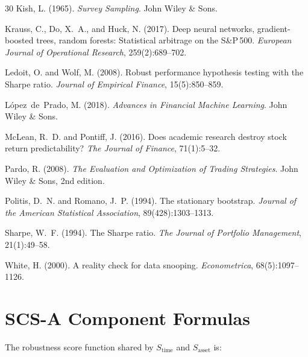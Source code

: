 \documentclass[12pt,a4paper]{article}
\begin{document}
\begin{thebibliography}{30}
Kish, L. (1965).
\newblock \emph{Survey Sampling}.
\newblock John Wiley \& Sons.

Krauss, C., Do, X.~A., and Huck, N. (2017).
\newblock Deep neural networks, gradient-boosted trees, random forests:
  Statistical arbitrage on the S\&P\,500.
\newblock \emph{European Journal of Operational Research}, 259(2):689--702.

Ledoit, O. and Wolf, M. (2008).
\newblock Robust performance hypothesis testing with the Sharpe ratio.
\newblock \emph{Journal of Empirical Finance}, 15(5):850--859.

L{\'o}pez~de~Prado, M. (2018).
\newblock \emph{Advances in Financial Machine Learning}.
\newblock John Wiley \& Sons.

McLean, R.~D. and Pontiff, J. (2016).
\newblock Does academic research destroy stock return predictability?
\newblock \emph{The Journal of Finance}, 71(1):5--32.

Pardo, R. (2008).
\newblock \emph{The Evaluation and Optimization of Trading Strategies}.
\newblock John Wiley \& Sons, 2nd edition.

Politis, D.~N. and Romano, J.~P. (1994).
\newblock The stationary bootstrap.
\newblock \emph{Journal of the American Statistical Association}, 89(428):1303--1313.

Sharpe, W.~F. (1994).
\newblock The Sharpe ratio.
\newblock \emph{The Journal of Portfolio Management}, 21(1):49--58.

White, H. (2000).
\newblock A reality check for data snooping.
\newblock \emph{Econometrica}, 68(5):1097--1126.

\end{thebibliography}


\appendix
\section{SCS-A Component Formulas}
\label{app:scs_a}

The robustness score function shared by $S_{\text{time}}$ and $S_{\text{asset}}$ is:
\end{document}
